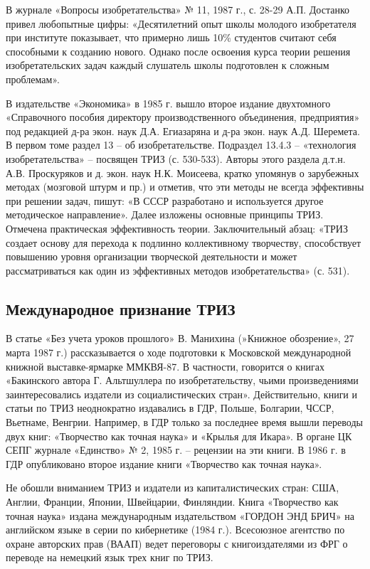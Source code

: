 \documentclass[11pt,a4paper]{article}
\begin{document}
В журнале «Вопросы изобретательства» № 11, 1987 г., с. 28-29 А.П. Достанко
привел любопытные цифры: «Десятилетний опыт школы молодого изобретателя при
институте показывает, что примерно лишь 10\% студентов считают себя способными
к созданию нового. Однако после освоения курса теории решения изобретательских
задач каждый слушатель школы подготовлен к сложным проблемам».

В издательстве «Экономика» в 1985 г. вышло второе издание двухтомного
«Справочного пособия директору производственного объединения, предприятия» под
редакцией д-ра экон. наук Д.А. Егиазаряна и д-ра экон. наук А.Д. Шеремета. В
первом томе раздел 13 -- об изобретательстве. Подраздел 13.4.3 -- «технология
изобретательства» -- посвящен ТРИЗ (с. 530-533). Авторы этого раздела
д.т.н. А.В. Проскуряков и д. экон. наук Н.К. Моисеева, кратко упомянув о
зарубежных методах (мозговой штурм и пр.) и отметив, что эти методы не всегда
эффективны при решении задач, пишут: «В СССР разработано и используется другое
методическое направление». Далее изложены основные принципы ТРИЗ. Отмечена
практическая эффективность теории. Заключительный абзац: «ТРИЗ создает основу
для перехода к подлинно коллективному творчеству, способствует повышению
уровня организации творческой деятельности и может рассматриваться как один из
эффективных методов изобретательства» (с. 531).

\subsection{Международное признание ТРИЗ}

В статье «Без учета уроков прошлого» В. Манихина (»Книжное обозрение», 27
марта 1987 г.) рассказывается о ходе подготовки к Московской международной
книжной выставке-ярмарке ММКВЯ-87. В частности, говорится о книгах «Бакинского
автора Г. Альтшуллера по изобретательству, чьими произведениями
заинтересовались издатели из социалистических стран». Действительно, книги и
статьи по ТРИЗ неоднократно издавались в ГДР, Польше, Болгарии, ЧССР,
Вьетнаме, Венгрии. Например, в ГДР только за последнее время вышли переводы
двух книг: «Творчество как точная наука» и «Крылья для Икара». В органе ЦК
СЕПГ журнале «Единство» № 2, 1985 г. -- рецензии на эти книги. В 1986 г. в ГДР
опубликовано второе издание книги «Творчество как точная наука».

Не обошли вниманием ТРИЗ и издатели из капиталистических стран: США, Англии,
Франции, Японии, Швейцарии, Финляндии. Книга «Творчество как точная наука»
издана международным издательством «ГОРДОН ЭНД БРИЧ» на английском языке в
серии по кибернетике (1984 г.). Всесоюзное агентство по охране авторских прав
(ВААП) ведет переговоры с книгоиздателями из ФРГ о переводе на немецкий язык
трех книг по ТРИЗ.
\end{document}
